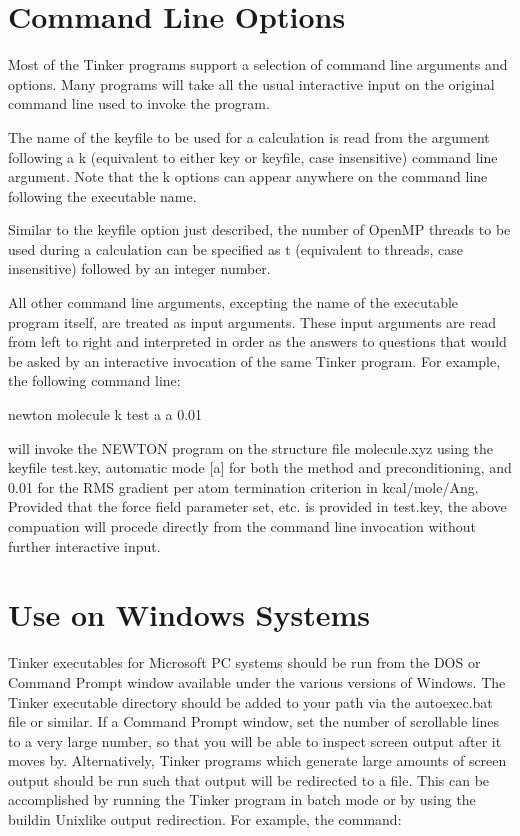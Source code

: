 \documentclass[letterpaper,11pt,english]{sphinxmanual}
\begin{document}
\section{Command Line Options}
\label{\detokenize{text/special-features:command-line-options}}
Most of the Tinker programs support a selection of command line arguments and options. Many programs will take all the usual interactive input on the original command line used to invoke the program.

The name of the keyfile to be used for a calculation is read from the argument following a \sphinxhyphen{}k (equivalent to either \sphinxhyphen{}key or \sphinxhyphen{}keyfile, case insensitive) command line argument. Note that the \sphinxhyphen{}k options can appear anywhere on the command line following the executable name.

Similar to the keyfile option just described, the number of OpenMP threads to be used during a calculation can be specified as \sphinxhyphen{}t (equivalent to \sphinxhyphen{}threads, case insensitive) followed by an integer number.

All other command line arguments, excepting the name of the executable program itself, are treated as input arguments. These input arguments are read from left to right and interpreted in order as the answers to questions that would be asked by an interactive invocation of the same Tinker program. For example, the following command line:

newton molecule \sphinxhyphen{}k test a a 0.01

will invoke the NEWTON program on the structure file molecule.xyz using the keyfile test.key, automatic mode {[}a{]} for both the method and preconditioning, and 0.01 for the RMS gradient per atom termination criterion in kcal/mole/Ang. Provided that the force field parameter set, etc. is provided in test.key, the above compuation will procede directly from the command line invocation without further interactive input.


\section{Use on Windows Systems}
\label{\detokenize{text/special-features:use-on-windows-systems}}
Tinker executables for Microsoft PC systems should be run from the DOS or Command Prompt window available under the various versions of Windows. The Tinker executable directory should be added to your path via the autoexec.bat file or similar. If a Command Prompt window, set the number of scrollable lines to a very large number, so that you will be able to inspect screen output after it moves by. Alternatively, Tinker programs which generate large amounts of screen output should be run such that output will be redirected to a file. This can be accomplished by running the Tinker program in batch mode or by using the build\sphinxhyphen{}in Unix\sphinxhyphen{}like output redirection. For example, the command:
\end{document}
